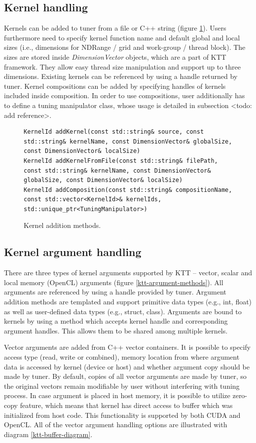 \documentclass
[
    digital, %
    oneside, %
    table, %
    nolof, %
    nolot, %
    nocover %
]{fithesis3}
\begin{document}
\subsection{Kernel handling}
Kernels can be added to tuner from a file or C++ string (figure \ref{ktt-kernel-methods}). Users furthermore need to specify kernel function name and
default global and local sizes (i.e., dimensions for NDRange / grid and work-group / thread block). The sizes are stored inside \textit{DimensionVector}
objects, which are a part of KTT framework. They allow easy thread size manipulation and support up to three dimensions. Existing kernels can be
referenced by using a handle returned by tuner. Kernel compositions can be added by specifying handles of kernels included inside composition. In
order to use compositions, user additionally has to define a tuning manipulator class, whose usage is detailed in subsection <todo: add reference>.
\begin{figure}
\begin{lstlisting}
KernelId addKernel(const std::string& source, const std::string& kernelName, const DimensionVector& globalSize, const DimensionVector& localSize)
KernelId addKernelFromFile(const std::string& filePath, const std::string& kernelName, const DimensionVector& globalSize, const DimensionVector& localSize)
KernelId addComposition(const std::string& compositionName, const std::vector<KernelId>& kernelIds, std::unique_ptr<TuningManipulator>)
\end{lstlisting}
\caption{Kernel addition methods.}
\label{ktt-kernel-methods}
\end{figure}
\subsection{Kernel argument handling}
There are three types of kernel arguments supported by KTT -- vector, scalar and local memory (OpenCL) arguments (figure \ref{ktt-argument-methods}).
All arguments are referenced by using a handle provided by tuner. Argument addition methods are templated and support primitive data types (e.g.,
int, float) as well as user-defined data types (e.g., struct, class). Arguments are bound to kernels by using a method which accepts kernel handle
and corresponding argument handles. This allows them to be shared among multiple kernels.

Vector arguments are added from C++ vector containers. It is possible to specify access type (read, write or combined), memory location from where
argument data is accessed by kernel (device or host) and whether argument copy should be made by tuner. By default, copies of all vector arguments
are made by tuner, so the original vectors remain modifiable by user without interfering with tuning process. In case argument is placed in host
memory, it is possible to utilize zero-copy feature, which means that kernel has direct access to buffer which was initialized from host code. This
functionality is supported by both CUDA and OpenCL. All of the vector argument handling options are illustrated with diagram \ref{ktt-buffer-diagram}.
\end{document}
